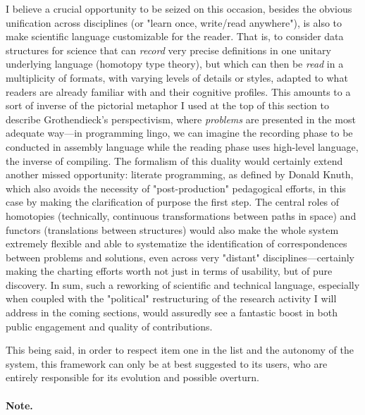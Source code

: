 \documentclass[11pt]{article}
\begin{document}
I believe a crucial opportunity to be seized on this occasion, besides the obvious
unification across disciplines (or "learn once, write/read anywhere"), is also to make
scientific language customizable for the reader. That is, to consider data structures
for science that can \emph{record} very precise definitions in one unitary underlying
language (homotopy type theory), but which can then be \emph{read} in a multiplicity of
formats, with varying levels of details or styles, adapted to what readers are already
familiar with and their cognitive profiles. This amounts to a sort of inverse of the
pictorial metaphor I used at the top of this section to describe Grothendieck's
perspectivism, where \emph{problems} are presented in the most adequate way---in
programming lingo, we can imagine the recording phase to be conducted in assembly
language while the reading phase uses high-level language, the inverse of compiling. The
formalism of this duality would certainly extend another missed opportunity: literate
programming, as defined by Donald Knuth, which also avoids the necessity of
"post-production" pedagogical efforts, in this case by making the clarification of
purpose the first step. The central roles of homotopies (technically, continuous
transformations between paths in space) and functors (translations between structures)
would also make the whole system extremely flexible and able to systematize the
identification of correspondences between problems and solutions, even across very
"distant" disciplines---certainly making the charting efforts worth not just in terms of
usability, but of pure discovery. In sum, such a reworking of scientific and technical
language, especially when coupled with the "political" restructuring of the research
activity I will address in the coming sections, would assuredly see a fantastic boost in
both public engagement and quality of contributions.

This being said, in order to respect item one in the list and the autonomy of the
system, this framework can only be at best suggested to its users, who are entirely
responsible for its evolution and possible overturn.

\paragraph{Note.}
\end{document}
